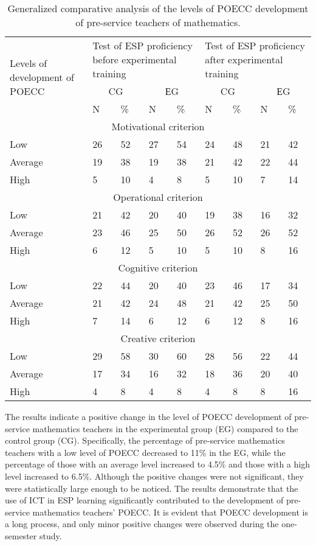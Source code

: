 \begin{table}[!htpb]
\centering
\begin{threeparttable}
\caption{Generalized comparative analysis of the levels of POECC development of pre-service teachers of mathematics.}
\label{tab-04}
\begin{tabular}{*{9}{l}}
\toprule
\multicolumn{1}{p{3cm}}{\multirow{3}{=}{Levels of development of POECC}} & \multicolumn{4}{p{4cm}}{Test of ESP proficiency before experimental training} & \multicolumn{4}{p{4cm}}{Test of ESP proficiency after experimental training} \\
 &	\multicolumn{2}{c}{CG} & \multicolumn{2}{c}{ЕG} & \multicolumn{2}{c}{CG} & \multicolumn{2}{c}{ЕG}\\
 & N & \% & N & \% & N & \% & N & \% \\
\midrule
\multicolumn{9}{c}{Motivational criterion} \\
Low & 26 & 52 & 27 & 54 & 24 & 48 & 21 & 42 \\
Average & 19 & 38 & 19 & 38 & 21 & 42 & 22 & 44 \\
High & 5 & 10 & 4 & 8 & 5 & 10 & 7 & 14 \\			
\midrule
\multicolumn{9}{c}{Operational criterion}\\
Low & 21 & 42 & 20 & 40 & 19 & 38 & 16 & 32 \\
Average & 23 & 46 & 25 & 50 & 26 & 52 & 26 & 52 \\
High & 6 & 12 & 5 & 10 & 5 & 10 & 8 & 16 \\
\midrule
\multicolumn{9}{c}{Cognitive criterion}\\
Low & 22 & 44 & 20 & 40 & 23 & 46 & 17 & 34 \\
Average & 21 & 42 & 24 & 48 & 21 & 42 & 25 & 50 \\
High & 7 & 14 & 6 & 12 & 6 & 12 & 8 & 16 \\			
\midrule
\multicolumn{9}{c}{Creative criterion}\\
Low & 29 & 58 & 30 & 60 & 28 & 56 & 22 & 44 \\
Average & 17 & 34 & 16 & 32 & 18 & 36 & 20 & 40 \\
High & 4 & 8 & 4 & 8 & 4 & 8 & 8 & 16 \\
\bottomrule
\end{tabular}
\end{threeparttable}
\end{table}

The results indicate a positive change in the level of POECC development
of pre-service mathematics teachers in the experimental group (EG)
compared to the control group (CG). Specifically, the percentage of
pre-service mathematics teachers with a low level of POECC decreased to
11\% in the EG, while the percentage of those with an average level
increased to 4.5\% and those with a high level increased to 6.5\%.
Although the positive changes were not significant, they were
statistically large enough to be noticed. The results demonstrate that
the use of ICT in ESP learning significantly contributed to the
development of pre-service mathematics teachers' POECC. It is evident
that POECC development is a long process, and only minor positive
changes were observed during the one-semester study.

